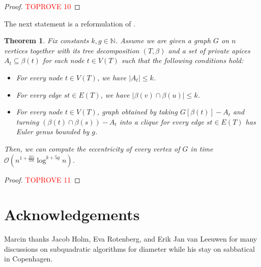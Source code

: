 \documentclass[11pt,a4paper]{article}
\newtheorem{theorem}[lemma]{Theorem}
\newcommand{\Oh}{\mathcal{O}}
\renewcommand{\leq}{\leqslant}
\renewcommand{\setminus}{-}
\begin{document}
\begin{proof}\textcolor{red}{TOPROVE 10}\end{proof}



The next statement is a reformulation of .

\begin{theorem}
Fix constants $k, g \in \mathbb{N}$. Assume we are given a graph $G$ on $n$ vertices together with its tree decomposition $(T, \beta)$ and a set of private apices $A_t \subseteq \beta(t)$ for each node $t\in V(T)$ such that the following conditions hold:
\begin{itemize}[nosep]
 \item For every node $t \in V(T)$, we have $|A_t| \leq k$.
 \item For every edge $st \in E(T)$,  we have $|\beta(v) \cap \beta(u)|\leq k$.
 \item For every node $t \in V(T)$, graph obtained by taking $G[\beta(t)] - A_t$ and turning  $(\beta(t) \cap \beta(s))\setminus A_t$ into a clique for every edge $st \in E(T)$ has Euler genus bounded by $g$.
\end{itemize}
Then, we can compute the eccentricity of every vertex of $G$ in time $\Oh \left( n^{1 + \frac{355}{356}} \log^{k + 5g} n \right)$.
\end{theorem}

\begin{proof}\textcolor{red}{TOPROVE 11}\end{proof}
 
\section*{Acknowledgements}
Marcin thanks Jacob Holm, Eva Rotenberg, and Erik Jan van Leeuwen
for many discussions on subquadratic algorithms for diameter while his stay on sabbatical
in Copenhagen.
\end{document}
